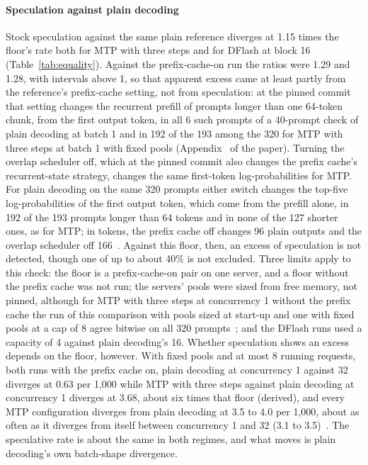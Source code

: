 \paragraph{Speculation against plain decoding} Stock speculation against the same plain reference diverges at 1.15 times the floor's rate both for MTP with three steps and for DFlash at block 16 (Table~\ref{tab:equality}). Against the prefix-cache-on run the ratios were 1.29 and 1.28, with intervals above 1, so that apparent excess came at least partly from the reference's prefix-cache setting, not from speculation: at the pinned commit that setting changes the recurrent prefill of prompts longer than one 64-token chunk, from the first output token, in all 6 such prompts of a 40-prompt check of plain decoding at batch 1 and in 192 of the 193 among the 320 for MTP with three steps at batch 1 with fixed pools (Appendix~ of the paper). Turning the overlap scheduler off, which at the pinned commit also changes the prefix cache's recurrent-state strategy, changes the same first-token log-probabilities for MTP. For plain decoding on the same 320 prompts either switch changes the top-five log-probabilities of the first output token, which come from the prefill alone, in 192 of the 193 prompts longer than 64 tokens and in none of the 127 shorter ones, as for MTP; in tokens, the prefix cache off changes 96 plain outputs and the overlap scheduler off 166~. Against this floor, then, an excess of speculation is not detected, though one of up to about 40\% is not excluded. Three limits apply to this check: the floor is a prefix-cache-on pair on one server, and a floor without the prefix cache was not run; the servers' pools were sized from free memory, not pinned, although for MTP with three steps at concurrency 1 without the prefix cache the run of this comparison with pools sized at start-up and one with fixed pools at a cap of 8 agree bitwise on all 320 prompts~; and the DFlash runs used a capacity of 4 against plain decoding's 16. Whether speculation shows an excess depends on the floor, however. With fixed pools and at most 8 running requests, both runs with the prefix cache on, plain decoding at concurrency 1 against 32 diverges at 0.63 per 1,000 while MTP with three steps against plain decoding at concurrency 1 diverges at 3.68, about six times that floor (derived), and every MTP configuration diverges from plain decoding at 3.5 to 4.0 per 1,000, about as often as it diverges from itself between concurrency 1 and 32 (3.1 to 3.5)~. The speculative rate is about the same in both regimes, and what moves is plain decoding's own batch-shape divergence.

